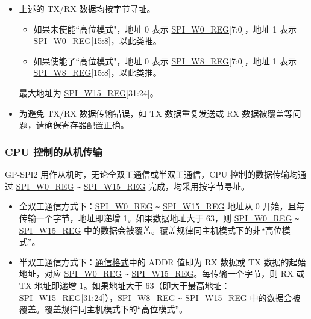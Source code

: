 \documentclass[main\_\_CN.tex]{subfiles}
\begin{document}
\begin{tiplisting}
\vspace{-2em}
\begin{itemize}
    \item 上述的 TX/RX 数据均按字节寻址。
    \begin{itemize}
        \item 如果未使能``高位模式"，地址 0 表示 \hyperref[regdesc:SPIW0REG]{SPI\_W0\_REG}[7:0]，地址 1 表示 \hyperref[regdesc:SPIW0REG]{SPI\_W0\_REG}[15:8]，以此类推。
        \item 如果使能了``高位模式"，地址 0 表示 \hyperref[regdesc:SPIW0REG]{SPI\_W8\_REG}[7:0]，地址 1 表示 \hyperref[regdesc:SPIW0REG]{SPI\_W8\_REG}[15:8]，以此类推。
    \end{itemize}
    最大地址为 \hyperref[regdesc:SPIW0REG]{SPI\_W15\_REG}[31:24]。
    \item 为避免 TX/RX 数据传输错误，如 TX 数据重复发送或 RX 数据被覆盖等问题，请确保寄存器配置正确。
\end{itemize}
\end{tiplisting}

\subsubsection{CPU 控制的从机传输} \label{GP-SPI2 slave CPU}

GP-SPI2 用作从机时，无论全双工通信或半双工通信，CPU 控制的数据传输均通过 \hyperref[regdesc:SPIW0REG]{SPI\_W0\_REG} \verb+~+ \hyperref[regdesc:SPIW0REG]{SPI\_W15\_REG} 完成，均采用按字节寻址。

\begin{itemize}
    \item 全双工通信方式下：\hyperref[regdesc:SPIW0REG]{SPI\_W0\_REG} \verb+~+ \hyperref[regdesc:SPIW0REG]{SPI\_W15\_REG} 地址从 0 开始，且每传输一个字节，地址即递增 1。如果数据地址大于 63，则 \hyperref[regdesc:SPIW0REG]{SPI\_W0\_REG} \verb+~+ \hyperref[regdesc:SPIW0REG]{SPI\_W15\_REG} 中的数据会被覆盖。覆盖规律同主机模式下的非“高位模式”。
    \item 半双工通信方式下：\hyperref[slave communication format]{通信格式}中的 ADDR 值即为 RX 数据或 TX 数据的起始地址，对应 \hyperref[regdesc:SPIW0REG]{SPI\_W0\_REG} \verb+~+ \hyperref[regdesc:SPIW0REG]{SPI\_W15\_REG}。每传输一个字节，则 RX 或 TX 地址即递增 1。如果地址大于 63（即大于最高地址：\hyperref[regdesc:SPIW0REG]{SPI\_W15\_REG}[31:24]），\hyperref[regdesc:SPIW0REG]{SPI\_W8\_REG} \verb+~+ \hyperref[regdesc:SPIW0REG]{SPI\_W15\_REG} 中的数据会被覆盖。覆盖规律同主机模式下的“高位模式”。
\end{itemize}
\end{document}
